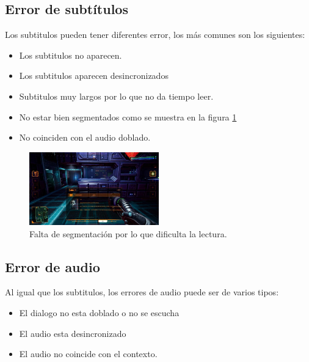 \subsection{Error de subtítulos}\label{ErrorSubtitulos}
Los subtitulos pueden tener diferentes error, los más comunes son los siguientes:
\begin{itemize}
	\item Los subtitulos no aparecen.
	\item Los subtitulos aparecen desincronizados
	\item Subtitulos muy largos por lo que no da tiempo leer.
	\item No estar bien segmentados como se muestra en la figura \ref{fig:ESubtitulo}
	\item No coinciden con el audio doblado.
\end{itemize}
\begin{figure}[H]
	\centering
	\includegraphics[width = 0.5\textwidth]{Imagenes/Errores_Localizacion/E_Subtitulo.png}
	\caption{Falta de segmentación por lo que dificulta la lectura.}
	\label{fig:ESubtitulo}
\end{figure}
\subsection{Error de audio}\label{ErrorAudio}

Al igual que los subtitulos, los errores de audio puede ser de varios tipos:
\begin{itemize}
	\item El dialogo no esta doblado o no se escucha
	\item El audio esta desincronizado
	\item El audio no coincide con el contexto.
\end{itemize}

